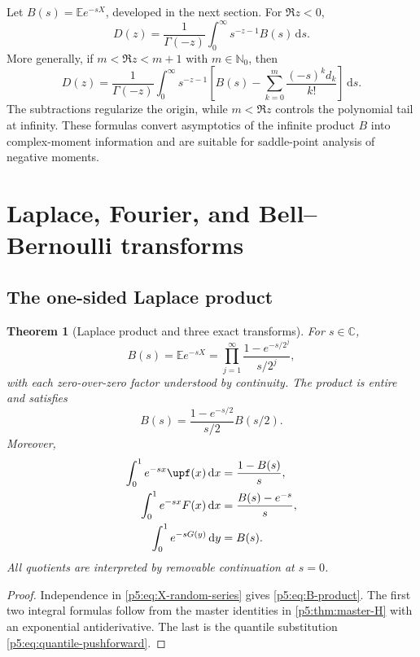 \documentclass[11pt,oneside]{article}
\newtheorem{theorem}{Theorem}[section]
\theoremstyle{definition}
\theoremstyle{remark}
\newcommand{\E}{\mathbb E}
\newcommand{\C}{\mathbb C}
\newcommand{\N}{\mathbb N}
\newcommand{\dd}{\,\mathrm d}
\newcommand{\1}{\mathbf 1}
\begin{document}
Let $B(s)=\E e^{-sX}$, developed in the next section.  For $\Re z<0$,
\begin{equation}\label{p5:eq:mellin-laplace-negative}
 D(z)=\frac1{\Gamma(-z)}\int_0^\infty s^{-z-1}B(s)\dd s.
\end{equation}
More generally, if $m<\Re z<m+1$ with $m\in\N_0$, then
\begin{equation}\label{p5:eq:mellin-laplace-subtracted}
 D(z)=\frac1{\Gamma(-z)}\int_0^\infty s^{-z-1}
 \left[B(s)-\sum_{k=0}^{m}\frac{(-s)^kd_k}{k!}\right]\dd s.
\end{equation}
The subtractions regularize the origin, while $m<\Re z$ controls the polynomial tail at infinity.  These formulas convert asymptotics of the infinite product $B$ into complex-moment information and are suitable for saddle-point analysis of negative moments.

\section{Laplace, Fourier, and Bell--Bernoulli transforms}

\subsection{The one-sided Laplace product}

\begin{theorem}[Laplace product and three exact transforms]\label{p5:thm:laplace-product}
For $s\in\C$,
\begin{equation}\label{p5:eq:B-product}
 B(s)=\E e^{-sX}
 =\prod_{j=1}^{\infty}
 \frac{1-e^{-s/2^j}}{s/2^j},
\end{equation}
with each zero-over-zero factor understood by continuity.  The product is entire and satisfies
\begin{equation}\label{p5:eq:B-dilation}
 B(s)=\frac{1-e^{-s/2}}{s/2}B(s/2).
\end{equation}
Moreover,
\begin{align}
 \int_0^1e^{-sx}\upf(x)\dd x
 &=\frac{1-B(s)}s,\label{p5:eq:laplace-up-one-sided}\\
 \int_0^1e^{-sx}F(x)\dd x
 &=\frac{B(s)-e^{-s}}s,\label{p5:eq:laplace-F-one-sided}\\
 \int_0^1e^{-sG(y)}\dd y
 &=B(s).\label{p5:eq:laplace-inverse}
\end{align}
All quotients are interpreted by removable continuation at $s=0$.
\end{theorem}

\begin{proof}
Independence in \eqref{p5:eq:X-random-series} gives \eqref{p5:eq:B-product}.  The first two integral formulas follow from the master identities in \cref{p5:thm:master-H} with an exponential antiderivative.  The last is the quantile substitution \eqref{p5:eq:quantile-pushforward}.
\end{proof}
\end{document}
